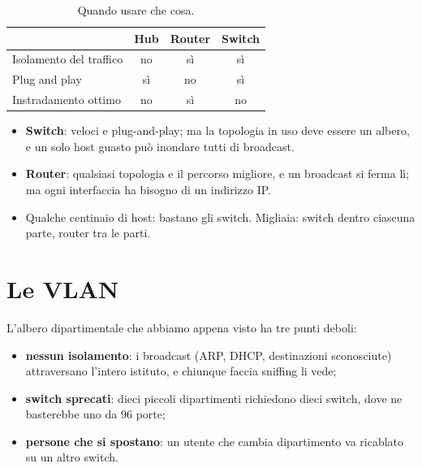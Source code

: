 \begin{table}[H]
\centering
\begin{tabular}{lccc}
\toprule
 & \textbf{Hub} & \textbf{Router} & \textbf{Switch} \\
\midrule
Isolamento del traffico & no & sì & sì \\
Plug and play & sì & no & sì \\
Instradamento ottimo & no & sì & no \\
\bottomrule
\end{tabular}
\caption{Quando usare che cosa.}
\end{table}

\begin{itemize}
    \item \textbf{Switch}: veloci e plug-and-play; ma la topologia in uso deve essere un albero, e un solo host guasto può inondare tutti
          di broadcast.
    \item \textbf{Router}: qualsiasi topologia e il percorso migliore, e un broadcast si ferma lì; ma ogni interfaccia ha bisogno di un
          indirizzo IP.
    \item Qualche centinaio di host: bastano gli switch. Migliaia: switch dentro ciascuna parte, router tra le parti.
\end{itemize}

\section{Le VLAN}

L'albero dipartimentale che abbiamo appena visto ha tre punti deboli:

\begin{itemize}
    \item \textbf{nessun isolamento}: i broadcast (ARP, DHCP, destinazioni sconosciute) attraversano l'intero istituto, e chiunque
          faccia sniffing li vede;
    \item \textbf{switch sprecati}: dieci piccoli dipartimenti richiedono dieci switch, dove ne basterebbe uno da 96 porte;
    \item \textbf{persone che si spostano}: un utente che cambia dipartimento va ricablato su un altro switch.
\end{itemize}


